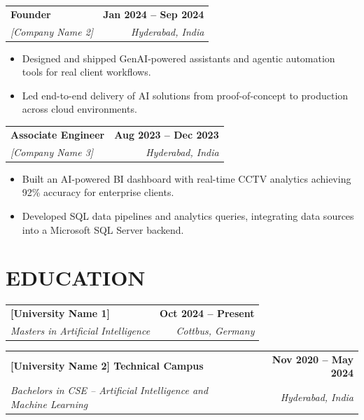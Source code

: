 \documentclass[a4paper,11pt]{article}
\makeatletter
\newcommand{\entryheader}[4]{%
  \begin{tabularx}{\textwidth}{@{}>{\RaggedRight\arraybackslash}X r@{}}
    \textbf{#1} & \textbf{#2} \\
    \textit{#3} & \textit{#4} \\
  \end{tabularx}%
}
\newenvironment{entrybullets}{%
  \begin{minipage}[t]{0.77\textwidth}
    \begin{itemize}[leftmargin=*,label=\textbullet,align=left]
}{%
    \end{itemize}
  \end{minipage}
}
\makeatother
\begin{document}
\vspace{0.25cm}
\entryheader{Founder}{Jan 2024 -- Sep 2024}{[Company Name 2]}{Hyderabad, India}
\begin{entrybullets}
  \item Designed and shipped GenAI-powered assistants and agentic automation tools for real client workflows.
  \item Led end-to-end delivery of AI solutions from proof-of-concept to production across cloud environments.
\end{entrybullets}

\vspace{0.25cm}
\entryheader{Associate Engineer}{Aug 2023 -- Dec 2023}{[Company Name 3]}{Hyderabad, India}
\begin{entrybullets}
  \item Built an AI-powered BI dashboard with real-time CCTV analytics achieving 92\% accuracy for enterprise clients.
  \item Developed SQL data pipelines and analytics queries, integrating data sources into a Microsoft SQL Server backend.
\end{entrybullets}

\section*{EDUCATION}
\begin{tabularx}{\textwidth}{@{}X r@{}}
  \textbf{[University Name 1]} & \textbf{Oct 2024 -- Present} \\
  \textit{Masters in Artificial Intelligence} & \textit{Cottbus, Germany} \\
\end{tabularx}

\vspace{0.25cm}
\begin{tabularx}{\textwidth}{@{}X r@{}}
  \textbf{[University Name 2] Technical Campus} & \textbf{Nov 2020 -- May 2024} \\
  \textit{Bachelors in CSE -- Artificial Intelligence and Machine Learning} & \textit{Hyderabad, India} \\
\end{tabularx}

\end{document}
